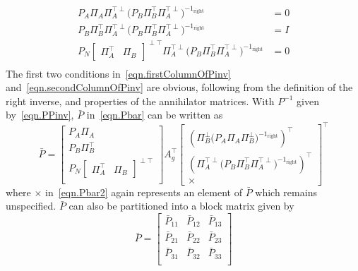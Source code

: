 \documentclass[journal]{IEEEtran}
\theoremstyle{innercustomthm}
\begin{document}
  \begin{equation}
  \label{eqn.secondColumnOfPinv}
    \begin{split}
      P_{A}\Pi_{A}\Pi_{A}^{\top\perp}\bigr(P_{B}\Pi_{B}^{\top}\Pi_{A}^{\top\perp}\bigr)^{-1_{\text{right}}}
      &= 0 \\
      P_{B}\Pi_{B}^{\top}\Pi_{A}^{\top\perp}\bigr(P_{B}\Pi_{B}^{\top}\Pi_{A}^{\top\perp}\bigr)^{-1_{\text{right}}}
      &= I \\
      P_{N}
      \begin{bmatrix}
        \Pi_{A}^{\top} & \Pi_{B}
      \end{bmatrix}^{\perp\top}
      \Pi_{A}^{\top\perp}\bigr(P_{B}\Pi_{B}^{\top}\Pi_{A}^{\top\perp}\bigr)^{-1_{\text{right}}}
      &= 0 \\
    \end{split}
  \end{equation}
  The first two conditions in\ \eqref{eqn.firstColumnOfPinv} and\ \eqref{eqn.secondColumnOfPinv} are obvious, following from the definition of the right inverse, and properties of the annihilator matrices.
  With $P^{-1}$ given by\ \eqref{eqn.PPinv}, $\bar{P}$ in\ \eqref{eqn.Pbar} can be written as
  {%
    \small
    \begin{equation}
      \label{eqn.Pbar2}
      \bar{P} =
      \begin{bmatrix}
        P_{A}\Pi_{A} \\
        P_{B}\Pi_{B}^{\top} \\
        P_{N}
        \begin{bmatrix}
          \Pi_{A}^{\top} & \Pi_{B}
        \end{bmatrix}^{\perp\top} \\
      \end{bmatrix}
      A_{g}^{\top}
      \begin{bmatrix}
        (\Pi_{B}^{\perp}\bigr(P_{A}\Pi_{A}\Pi_{B}^{\perp}\bigr)^{-1_{\text{right}}})^{\top} \\
        (\Pi_{A}^{\top\perp}\bigr(P_{B}\Pi_{B}^{\top}\Pi_{A}^{\top\perp}\bigr)^{-1_{\text{right}}})^{\top} \\
        \times
      \end{bmatrix}^{\top}
    \end{equation}
  }%
  where $\times$ in\ \eqref{eqn.Pbar2} again represents an element of $\bar{P}$ which remains unspecified.
  $\bar{P}$ can also be partitioned into a block matrix given by
  \begin{equation}
    \label{eqn.PbarPartitioned}
    \bar{P} =
    \begin{bmatrix}
      \bar{P}_{11} & \bar{P}_{12} & \bar{P}_{13} \\
      \bar{P}_{21} & \bar{P}_{22} & \bar{P}_{23}\\
      \bar{P}_{31} & \bar{P}_{32} & \bar{P}_{33}\\
    \end{bmatrix}
  \end{equation}
\end{document}
